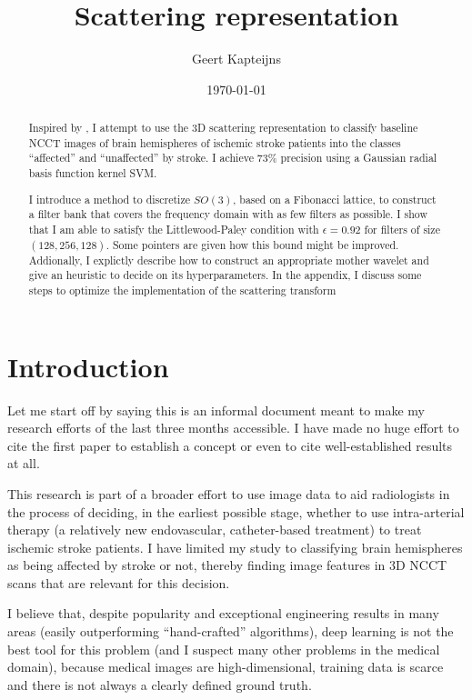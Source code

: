 \documentclass[twocolumn, openany, oneside, article]{memoir}
\title{Scattering representation}
\author{Geert Kapteijns}
\date{\today}
\begin{document}
\maketitle
\pagestyle{simple}

\begin{abstract}

Inspired by \cite{adel2017scattering}, I attempt to use the 3D scattering
representation to classify baseline NCCT images of brain hemispheres of ischemic
stroke patients into the classes \enquote{affected} and \enquote{unaffected} by
stroke. I achieve 73\% precision using a Gaussian radial basis function kernel SVM.

I introduce a method to discretize $SO(3)$, based on a Fibonacci lattice, to construct a filter bank
that covers the frequency domain with as few filters as possible. I show that I am able to satisfy
the Littlewood-Paley condition with $\epsilon = 0.92$ for filters of size $(128, 256, 128)$.
Some pointers are given how this bound might be improved. Addionally, I explictly describe how to
construct an appropriate mother wavelet and give an heuristic to decide on its hyperparameters. In the appendix,
I discuss some steps to optimize the implementation of the scattering transform

\end{abstract}

\chapter{Introduction}

Let me start off by saying this is an informal document meant to make my
research efforts of the last three months accessible. I have made no huge effort
to cite the first paper to establish a concept or even to cite well-established
results at all.

This research is part of a broader effort to use image data to aid radiologists in the process of deciding, in
the earliest possible stage, whether to use intra-arterial therapy (a relatively new endovascular, catheter-based
treatment) to treat ischemic stroke patients.
I have limited my study to classifying brain hemispheres as being affected by stroke or not, thereby finding image features in 3D NCCT scans that are relevant for this decision.

I believe that,
despite popularity and exceptional engineering results in many areas (easily outperforming \enquote{hand-crafted}
algorithms), deep learning is not the best tool for this problem (and I suspect many other problems in the medical
domain), because medical images are high-dimensional, training data is scarce and there is not always a clearly defined
ground truth.
\end{document}
